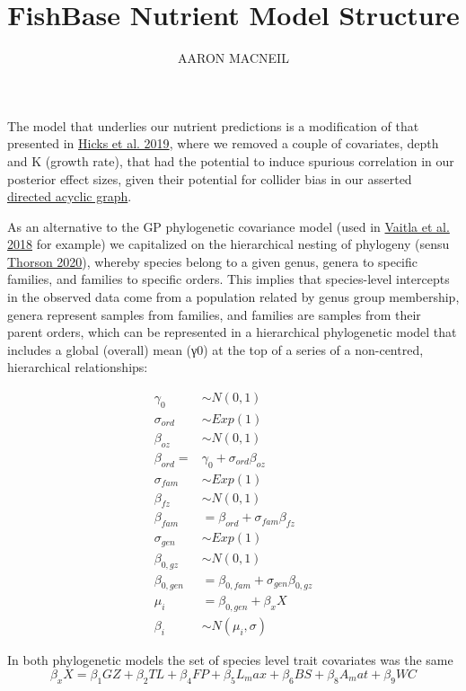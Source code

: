 \documentclass{article}
\title{FishBase Nutrient Model Structure}
\author{AARON MACNEIL}
\begin{document}
\maketitle

The model that underlies our nutrient predictions is a modification of that presented in \href{https://www.nature.com/articles/s41586-019-1592-6}{Hicks et al. 2019}, where we removed a couple of covariates, depth and K (growth rate), that had the potential to induce spurious correlation in our posterior effect sizes, given their potential for collider bias in our asserted \href{https://github.com/mamacneil/NutrientFishbase/blob/master/model/nutrients_DAG.jpg}{directed acyclic graph}.

As an alternative to the GP phylogenetic covariance model (used in \href{https://www.nature.com/articles/s41467-018-06199-w}{Vaitla et al. 2018} for example) we capitalized on the hierarchical nesting of phylogeny (sensu \href{https://onlinelibrary.wiley.com/doi/abs/10.1111/faf.12427}{Thorson 2020}), whereby species belong to a given genus, genera to specific families, and families to specific orders. This implies that species-level intercepts in the observed data come from a population related by genus group membership, genera represent samples from families, and families are samples from their parent orders, which can be represented in a hierarchical phylogenetic model that includes a global (overall) mean (γ0) at the top of a series of a non-centred, hierarchical relationships:

\begin{align*}
\gamma_0 &\sim N(0,1)\\
\sigma_{ord} &\sim Exp(1)\\
\beta_{oz} &\sim N(0,1)\\
\beta_{ord} = &\gamma_0+\sigma_{ord} \beta_{oz}\\
\sigma_{fam} &\sim Exp(1)\\
\beta_{fz} &\sim N(0,1)\\
\beta_{fam} &= \beta_{ord}+\sigma_{fam} \beta_{fz}\\
\sigma_{gen} &\sim Exp(1)\\
\beta_{0,gz} &\sim N(0,1)\\
\beta_{0,gen} &= \beta_{0,fam}+\sigma_{gen} \beta_{0,gz}\\
\mu_i &= \beta_{0,gen}+\beta_x X\\
\beta_i &\sim N(\mu_i,\sigma)
\end{align*}

In both phylogenetic models the set of species level trait covariates was the same
\[
\beta_x X = \beta_1 GZ+\beta_2 TL+\beta_4 FP+\beta_5 L_max+\beta_6 BS+\beta_8 A_mat+\beta_9 WC
\]
\end{document}
